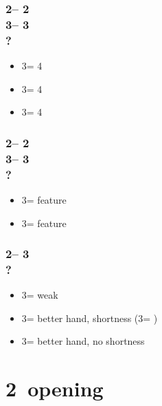 \documentclass[12pt, a4paper]{report}
\begin{document}
{{        \subsubsection*{2\hearts -- 2\nt\\
                        3\clubs -- 3\diams\\
                        ?}
        \begin{itemize}
            \item 3\hearts = 4\spades
            \item 3\spades = 4\clubs
            \item 3\nt = 4\diams
        \end{itemize}

        \subsubsection*{2\hearts -- 2\nt\\
                        3\diams -- 3\hearts\\
                        ?}
        \begin{itemize}
            \item 3\spades = \clubs feature
            \item 3\nt = \diams feature
        \end{itemize}

        \subsubsection*{2\hearts -- 3\diams\\
                        ?}
        \begin{itemize}
            \item 3\hearts = weak
            \item 3\spades = better hand, shortness (3\nt = \ahsf)
            \item 3\nt = better hand, no shortness
        \end{itemize}
    }

    \section*{\colorbox{blue!30}{2\spades\ opening}}
     {

}}
\end{document}
